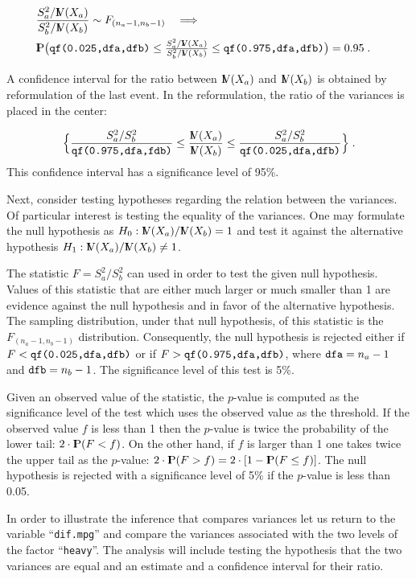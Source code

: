 \documentclass[]{krantz}
\newcommand{\Prob}{{\rm I\kern-.3em P}}
\newcommand{\Var}{{\rm I\kern-.3em V}}
\theoremstyle{definition}
\theoremstyle{definition}
\theoremstyle{definition}
\theoremstyle{remark}
\begin{document}
\[\begin{aligned}
\lefteqn{\frac{S_a^2/\Var(X_a)}{S_b^2/\Var(X_b)} \sim F_{(n_a-1,n_b-1)} \quad \Longrightarrow }\\ & \Prob \big( \mbox{\texttt{qf(0.025,dfa,dfb)}} \leq  {\textstyle \frac{S_a^2/\Var(X_a)}{S_b^2/\Var(X_b)}}  \leq \mbox{\texttt{qf(0.975,dfa,dfb)}} \big) = 0.95\;.\end{aligned}\]

A confidence interval for the ratio between \(\Var(X_a)\) and \(\Var(X_b)\)
is obtained by reformulation of the last event. In the reformulation,
the ratio of the variances is placed in the center:

\[\Big\{\frac{S_a^2/S_b^2}{\mbox{\texttt{qf(0.975,dfa,fdb)}}} \leq  \frac{\Var(X_a)}{\Var(X_b)}  \leq \frac{S_a^2/S_b^2}{\mbox{\texttt{qf(0.025,dfa,dfb)}}}\Big\}\;.\]
This confidence interval has a significance level of 95\%.

Next, consider testing hypotheses regarding the relation between the
variances. Of particular interest is testing the equality of the
variances. One may formulate the null hypothesis as
\(H_0: \Var(X_a)/\Var(X_b) = 1\) and test it against the alternative
hypothesis \(H_1: \Var(X_a)/\Var(X_b) \not = 1\).

The statistic \(F = S_a^2/S_b^2\) can used in order to test the given null
hypothesis. Values of this statistic that are either much larger or much
smaller than 1 are evidence against the null hypothesis and in favor of
the alternative hypothesis. The sampling distribution, under that null
hypothesis, of this statistic is the \(F_{(n_a-1,n_b-1)}\) distribution.
Consequently, the null hypothesis is rejected either if
\(F < \mbox{\texttt{qf(0.025,dfa,dfb)}}\) or if
\(F >\mbox{\texttt{qf(0.975,dfa,dfb)}}\), where
\(\mbox{\texttt{dfa}} = n_a - 1\) and \(\mbox{\texttt{dfb}} = n_b - 1\). The
significance level of this test is 5\%.

Given an observed value of the statistic, the \(p\)-value is computed as
the significance level of the test which uses the observed value as the
threshold. If the observed value \(f\) is less than 1 then the \(p\)-value
is twice the probability of the lower tail: \(2\cdot \Prob(F < f)\). On
the other hand, if \(f\) is larger than 1 one takes twice the upper tail
as the \(p\)-value: \(2\cdot \Prob(F > f) = 2\cdot [1-\Prob(F \leq f)]\).
The null hypothesis is rejected with a significance level of 5\% if the
\(p\)-value is less than 0.05.

In order to illustrate the inference that compares variances let us
return to the variable ``\texttt{dif.mpg}'' and compare the variances associated
with the two levels of the factor ``\texttt{heavy}''. The analysis will include
testing the hypothesis that the two variances are equal and an estimate
and a confidence interval for their ratio.
\end{document}
